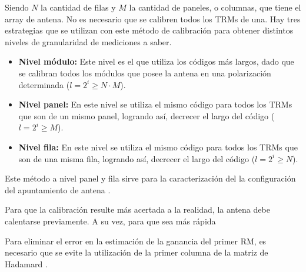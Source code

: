 Siendo $N$ la cantidad de filas y $M$ la cantidad de paneles, o columnas, que tiene el array de antena. No es necesario que 
se calibren todos los TRMs de una. Hay tres estrategias que se utilizan con este método de calibración para obtener 
distintos niveles de granularidad de mediciones a saber.

\begin{itemize}
	\item \textbf{Nivel módulo:} Este nivel es el que utiliza los códigos más largos, dado que se calibran todos los módulos que 
		posee la antena en una polarización determinada ($l = 2^i \ge N \cdot M$).
	\item \textbf{Nivel panel:} En este nivel se utiliza el mismo código para todos los TRMs que son de un mismo panel, 
		logrando así, decrecer el largo del código ($l = 2^i \ge M$).
	\item \textbf{Nivel fila:} En este nivel se utiliza el mismo código para todos los TRMs que son de una misma fila, 
		logrando así, decrecer el largo del código ($l = 2^i \ge N$).
\end{itemize}

Este método a nivel panel y fila sirve para la caracterización del la configuración del apuntamiento de antena \cite{Br2007}.


Para que la calibración resulte más acertada a la realidad, la antena debe calentarse previamente. A su vez, para que sea 
más rápida 


Para eliminar el error en la estimación de la ganancia del primer RM, es necesario que se evite la utilización de la 
primer columna de la matriz de Hadamard \cite{Wang2010}.



